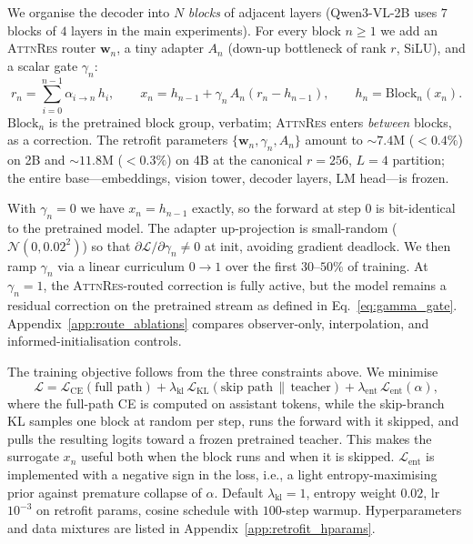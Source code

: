 \documentclass{article}
\newcommand{\attnres}{\textsc{AttnRes}}
\begin{document}
We organise the decoder into $N$ \emph{blocks} of adjacent layers (Qwen3-VL-2B uses $7$ blocks of $4$ layers in the main experiments). For every block $n\ge 1$ we add an \attnres{} router $\mathbf{w}_n$, a tiny adapter $A_n$ (down-up bottleneck of rank $r$, SiLU), and a scalar gate $\gamma_n$:
\begin{equation}
  r_n = \sum_{i=0}^{n-1} \alpha_{i \to n}\,h_i, \qquad
  x_n = h_{n-1} + \gamma_n\,A_n(r_n - h_{n-1}), \qquad
  h_n = \mathrm{Block}_n(x_n).
  \label{eq:gamma_gate}
\end{equation}
$\mathrm{Block}_n$ is the pretrained block group, verbatim; \attnres{} enters \emph{between} blocks, as a correction. The retrofit parameters $\{\mathbf{w}_n, \gamma_n, A_n\}$ amount to $\sim$$7.4$M ($<0.4\%$) on 2B and $\sim$$11.8$M ($<0.3\%$) on 4B at the canonical $r{=}256$, $L{=}4$ partition; the entire base---embeddings, vision tower, decoder layers, LM head---is frozen.

With $\gamma_n{=}0$ we have $x_n = h_{n-1}$ exactly, so the forward at step $0$ is bit-identical to the pretrained model. The adapter up-projection is small-random ($\mathcal{N}(0,0.02^2)$) so that $\partial\mathcal{L}/\partial\gamma_n \ne 0$ at init, avoiding gradient deadlock. We then ramp $\gamma_n$ via a linear curriculum $0\to 1$ over the first $30$--$50\%$ of training. At $\gamma_n{=}1$, the \attnres{}-routed correction is fully active, but the model remains a residual correction on the pretrained stream as defined in Eq.~\ref{eq:gamma_gate}. Appendix~\ref{app:route_ablations} compares observer-only, interpolation, and informed-initialisation controls.

The training objective follows from the three constraints above. We minimise
\begin{equation}
  \mathcal{L} = \mathcal{L}_{\text{CE}}(\text{full path}) + \lambda_{\text{kl}}\,\mathcal{L}_{\text{KL}}(\text{skip path}\,\|\,\text{teacher}) + \lambda_{\text{ent}}\,\mathcal{L}_{\text{ent}}(\alpha) ,
  \label{eq:retrofit_loss}
\end{equation}
where the full-path CE is computed on assistant tokens, while the skip-branch KL samples one block at random per step, runs the forward with it skipped, and pulls the resulting logits toward a frozen pretrained teacher. This makes the surrogate $x_n$ useful both when the block runs and when it is skipped. $\mathcal{L}_{\text{ent}}$ is implemented with a negative sign in the loss, i.e., a light entropy-maximising prior against premature collapse of $\alpha$. Default $\lambda_{\text{kl}}{=}1$, entropy weight $0.02$, lr $10^{-3}$ on retrofit params, cosine schedule with $100$-step warmup. Hyperparameters and data mixtures are listed in Appendix~\ref{app:retrofit_hparams}.
\end{document}
